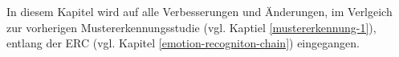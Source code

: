 

In diesem Kapitel wird auf alle Verbesserungen und Änderungen, im Verlgeich zur vorherigen Mustererkennungsstudie (vgl. Kaptiel \ref{mustererkennung-1}), entlang der ERC (vgl. Kapitel \ref{emotion-recogniton-chain}) eingegangen. \\










